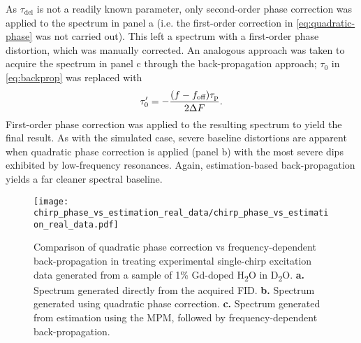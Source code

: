 As $\tau_{\text{del}}$ is not a readily known parameter, only second-order
phase correction was applied to the spectrum in panel a (i.e. the first-order
correction in \eqref{eq:quadratic-phase} was not carried out). This left a
spectrum with a first-order phase distortion, which was manually corrected. An
analogous approach was taken to acquire the spectrum in panel c through the
back-propagation approach; $\tau_0$ in \eqref{eq:backprop} was replaced with
\begin{equation}
    \tau_{0}^{\prime} = -\frac{(f - f_{\text{off}}) \tau_{\text{p}}}{2 \Delta F}.
\end{equation}
First-order phase correction was applied to the resulting spectrum to yield the
final result.
As with the simulated case, severe baseline distortions are apparent when
quadratic phase correction is applied (panel b) with the most severe dips
exhibited by low-frequency resonances. Again, estimation-based back-propagation
yields a far cleaner spectral baseline.
\begin{figure}
    \centering
    \texttt{[image: chirp\_phase\_vs\_estimation\_real\_data/chirp\_phase\_vs\_estimation\_real\_data.pdf]}
    \caption[
        Comparison of quadratic phase correction vs frequency-dependent
        back-propagation in treating experimental single-chirp excitation data
        generated from a sample of Gd-doped H\textsubscript{2}O in
        D\textsubscript{2}O.
    ]{
        Comparison of quadratic phase correction vs frequency-dependent
        back-propagation in treating experimental single-chirp excitation data
        generated from a sample of 1\% Gd-doped H\textsubscript{2}O in
        D\textsubscript{2}O.
        \textbf{a.} Spectrum generated directly from the acquired \ac{FID}.
        \textbf{b.} Spectrum generated using quadratic phase correction.
        \textbf{c.} Spectrum generated from estimation using the \ac{MPM},
        followed by frequency-dependent back-propagation.
    }
    \label{fig:bbqchili-real}
\end{figure}
